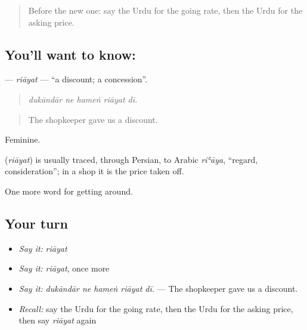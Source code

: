 \label{lesson:UR-C423-riayat}



\begin{quote}
Before the new one: say the Urdu for the going rate, then the Urdu for the asking price.
\end{quote}

\subsection*{You'll want to know: }
\textbf{} — \emph{riāyat} — \textquotedblleft{}a discount; a concession\textquotedblright{}.

\begin{quote}
    
\end{quote}

\begin{quote}
\emph{dukāndār ne hameṅ riāyat dī.}
\end{quote}

\begin{quote}
The shopkeeper gave us a discount.
\end{quote}

Feminine.

\begin{cousinweb}
\textbf{} (\emph{riāyat}) is usually traced, through Persian, to Arabic \emph{riʿāya}, \textquotedblleft{}regard, consideration\textquotedblright{}; in a shop it is the price taken off.
\end{cousinweb}

\begin{grammarlens}[title={What you've built}]
One more word for getting around.
\end{grammarlens}

\subsection*{Your turn}
\begin{itemize}
\raggedright
  \item \emph{Say it:} \emph{riāyat}
  \item \emph{Say it:} \emph{riāyat}, once more
  \item \emph{Say it:} \emph{dukāndār ne hameṅ riāyat dī.} — The shopkeeper gave us a discount.
  \item \emph{Recall:} say the Urdu for the going rate, then the Urdu for the asking price, then say \emph{riāyat} again
\end{itemize}

